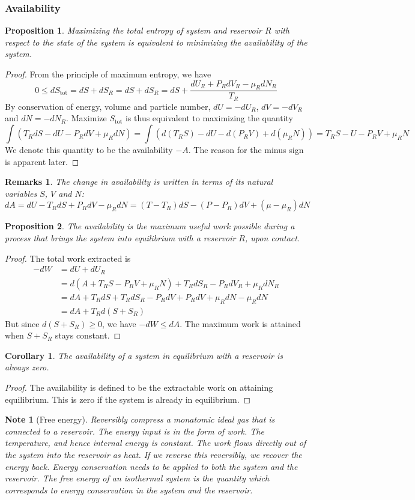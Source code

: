 \documentclass[a4paper]{article}
\newtheorem{remarks}{Remarks}[section]
\newtheorem{Note}{Note}[section]
\theoremstyle{new}
\newtheorem{prop}{Proposition}[section]
\newtheorem{cor}{Corollary}[section]
\begin{document}
\subsubsection*{Availability}
\begin{prop}
Maximizing the total entropy of system and reservoir $R$ with respect to the state of the system is equivalent to minimizing the availability of the system.
\end{prop}
\begin{proof}
From the principle of maximum entropy, we have
$$0\leq dS_{\text{tot}}=dS+dS_R=dS+dS_R=dS+\frac{dU_R+P_RdV_R-\mu_RdN_R}{T_R}$$
By conservation of energy, volume and particle number, $dU=-dU_R$, $dV=-dV_R$ and $dN=-dN_R$. Maximize $S_{\text{tot}}$ is thus equivalent to maximizing the quantity
$$\int(T_RdS-dU-P_RdV+\mu_RdN)=\int(d(T_RS)-dU-d(P_RV)+d(\mu_RN))=T_RS-U-P_RV+\mu_RN$$
We denote this quantity to be the availability $-A$. The reason for the minus sign is apparent later.
\end{proof}
\begin{remarks}
The change in availability is written in terms of its natural variables $S$, $V$ and $N$:
$$dA=dU-T_RdS+P_RdV-\mu_RdN=(T-T_R)dS-(P-P_R)dV+(\mu-\mu_R)dN$$
\end{remarks}
\begin{prop}
The availability is the maximum useful work possible during a process that brings the system into equilibrium with a reservoir $R$, upon contact.
\end{prop}
\begin{proof}
The total work extracted is
\begin{align}
-dW&=dU+dU_R\nonumber\\&=d(A+T_RS-P_RV+\mu_RN)+T_RdS_R-P_RdV_R+\mu_RdN_R\nonumber\\&=dA+T_RdS+T_RdS_R-P_RdV+P_RdV+\mu_RdN-\mu_RdN\nonumber\\&=dA+T_Rd(S+S_R)\nonumber
\end{align}
But since $d(S+S_R)\geq0$, we have $-dW\leq dA$. The maximum work is attained when $S+S_R$ stays constant.
\end{proof}
\begin{cor}
The availability of a system in equilibrium with a reservoir is always zero.
\end{cor}
\begin{proof}
The availability is defined to be the extractable work on attaining equilibrium. This is zero if the system is already in equilibrium.
\end{proof}
\begin{Note}[Free energy]
Reversibly compress a monatomic ideal gas that is connected to a reservoir. The energy input is in the form of work. The temperature, and hence internal energy is constant. The work flows directly out of the system into the reservoir as heat. If we reverse this reversibly, we recover the energy back. Energy conservation needs to be applied to both the system and the reservoir. The free energy of an isothermal system is the quantity which corresponds to energy conservation in the system and the reservoir.
\end{Note}
\end{document}
